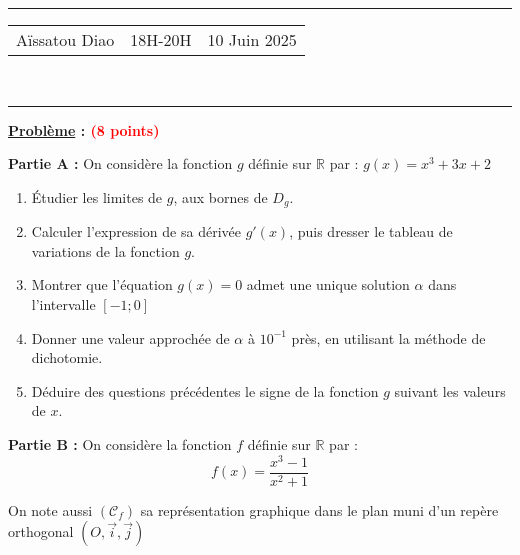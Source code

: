 \documentclass[a4paper,12pt]{article}
\begin{document}
\hrule %
\begin{center}
    \begin{tabular}{@{} p{5cm} p{5cm} p{5cm} @{}} %
        Aïssatou Diao & \quad\quad\quad 18H-20H & 10 Juin 2025 \\
    \end{tabular}
    \\[-0.01cm] %
    \hrule %
\end{center}

\textbf{\underline{Problème} : \textcolor{red}{(8 points)} }

\textbf{Partie A :} On considère la fonction $g$ définie sur $\mathbb{R}$ par : $g(x) = x^3 + 3x + 2$

\begin{enumerate}
    \item Étudier les limites de $g$, aux bornes de $D_g$.
    \item Calculer l'expression de sa dérivée $g'(x)$, puis dresser le tableau de variations de la fonction $g$.
    \item Montrer que l'équation $g(x) = 0$ admet une unique solution $\alpha$ dans l'intervalle $[-1;0]$
    \item Donner une valeur approchée de $\alpha$ à $10^{-1}$ près, en utilisant la méthode de dichotomie.
    \item Déduire des questions précédentes le signe de la fonction $g$ suivant les valeurs de $x$.
\end{enumerate}

\vspace{0.5cm}

\textbf{Partie B :} On considère la fonction $f$ définie sur $\mathbb{R}$ par : 
\[
f(x) = \frac{x^3 - 1}{x^2 + 1}
\]

On note aussi $(\mathcal{C}_f)$ sa représentation graphique dans le plan muni d’un repère orthogonal $(O, \vec{i}, \vec{j})$
\end{document}
